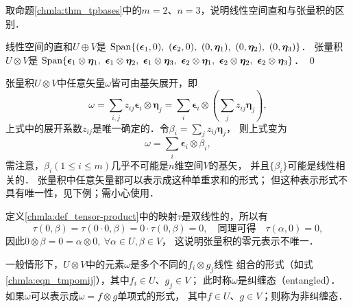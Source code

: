 \begin{example}
    取命题\ref{chmla:thm_tpbases}中的$m=2$、$n=3$，说明线性空间直和与张量积的区别．
\end{example}

线性空间的直和$U\oplus V$是
${\rm Span}\{(\boldsymbol{\epsilon}_1,0),\  (\boldsymbol{\epsilon}_2,0), \ 
(0,\boldsymbol{\eta}_1),\ (0,\boldsymbol{\eta}_2),\ (0,\boldsymbol{\eta}_3)\}$．
张量积$U\otimes V$是
${\rm Span}\{\boldsymbol{\epsilon}_1 \otimes \boldsymbol{\eta}_1,\ 
\boldsymbol{\epsilon}_1 \otimes \boldsymbol{\eta}_2,\ 
\boldsymbol{\epsilon}_1 \otimes \boldsymbol{\eta}_3,\ 
\boldsymbol{\epsilon}_2 \otimes \boldsymbol{\eta}_1,\ 
\boldsymbol{\epsilon}_2 \otimes \boldsymbol{\eta}_2,\ 
\boldsymbol{\epsilon}_2 \otimes \boldsymbol{\eta}_3\}$．
\qed



张量积$U\otimes V$中任意矢量$\omega$皆可由基矢展开，即
\begin{equation}\label{chmla:eqn_tmpomij}
    \omega = \sum_{i,j} z_{ij} \boldsymbol{\epsilon}_i \otimes \boldsymbol{\eta}_j
    = \sum_{i} \boldsymbol{\epsilon}_i \otimes  \left(\sum_{j}z_{ij}\boldsymbol{\eta}_j\right),
\end{equation}
上式中的展开系数$z_{ij}$是唯一确定的．令$\beta_i = \sum_{j}z_{ij}\boldsymbol{\eta}_j$，
则上式变为
\begin{equation}\label{chmla:eqn_tmp67}
    \omega = \sum_{i} \boldsymbol{\epsilon}_i \otimes  \beta _i ,
\end{equation}
需注意，$\beta_i(1\leqslant i \leqslant m)$几乎不可能是$n$维空间$V$的基矢，
并且$\{\beta_i\}$可能是线性相关的．
张量积中任意矢量都可以表示成这种单重求和的形式；
但这种表示形式不具有唯一性，见下例；需小心使用．
\begin{example}
    定义\ref{chmla:def_tensor-product}中的映射$\tau$是双线性的，所以有
    \begin{equation*}
        \tau(0,\beta)=\tau(0\cdot 0,\beta)=0\cdot \tau(0,\beta)=0,
        \quad \text{同理可得}\quad\tau(\alpha,0)=0 ,
    \end{equation*}
    因此$0 \otimes \beta =0=\alpha \otimes 0, \ \forall \alpha \in U, \beta \in V$，
    这说明张量积的零元表示不唯一．
\end{example}

一般情形下，$U\otimes V$中的元素$\omega$是多个不同的$f_i\otimes g_j$线性
组合的形式（如式\eqref{chmla:eqn_tmpomij}），其中$f_i\in U$、$g_j\in V$；
此时称$\omega$是{\heiti 纠缠态}（entangled）．    
如果$\omega$可以表示成$\omega=f\otimes g$单项式的形式，
其中$f\in U$、$g\in V$；则称为{\heiti 非纠缠态}．

